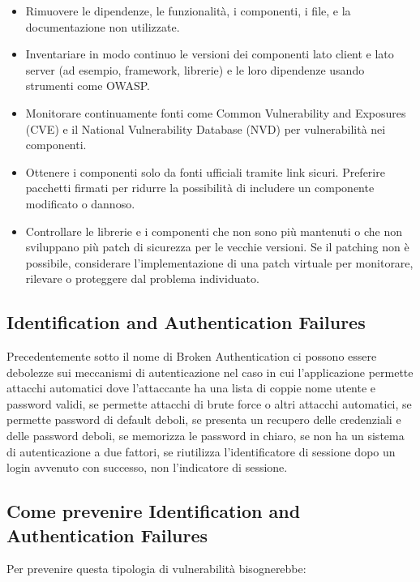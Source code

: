 \begin{itemize}
    \item Rimuovere le dipendenze, le funzionalità, i componenti, i file, e la documentazione non utilizzate.
    \item Inventariare in modo continuo le versioni dei componenti lato client e lato server (ad esempio, framework, librerie) e le loro dipendenze usando strumenti come OWASP.
    \item Monitorare continuamente fonti come Common Vulnerability and Exposures (CVE) e il National Vulnerability Database (NVD) per vulnerabilità nei componenti.
    \item Ottenere i componenti solo da fonti ufficiali tramite link sicuri. Preferire pacchetti firmati per ridurre la possibilità di includere un componente modificato o dannoso.
    \item Controllare le librerie e i componenti che non sono più mantenuti o che non sviluppano più patch di sicurezza per le vecchie versioni. Se il patching non è possibile, considerare l'implementazione di una patch virtuale per monitorare, rilevare o proteggere dal problema individuato.
\end{itemize}

\subsection{Identification and Authentication Failures}
Precedentemente sotto il nome di Broken Authentication ci possono essere debolezze sui meccanismi di autenticazione nel caso in cui l’applicazione permette attacchi automatici dove l’attaccante ha una lista di coppie nome utente e password validi, se permette attacchi di brute force o altri attacchi automatici, se permette password di default deboli, se presenta un recupero delle credenziali e delle password deboli, se memorizza le password in chiaro, se non ha un sistema di autenticazione a due fattori, se riutilizza l’identificatore di sessione dopo un login avvenuto con successo, non l’indicatore di sessione.
\subsection{Come prevenire Identification and Authentication Failures}
Per prevenire questa tipologia di vulnerabilità bisognerebbe: 

